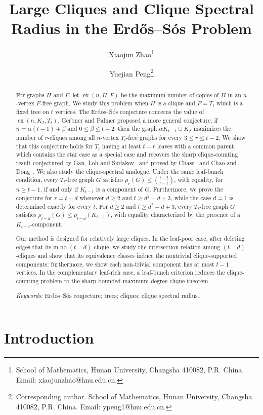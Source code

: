 \documentclass[11pt,a4paper]{article}
\title{Large Cliques and Clique Spectral Radius in the Erd\H{o}s--S\'{o}s Problem}
\author{Xiaojun Zhao\thanks{School of Mathematics, Hunan University, Changsha 410082, P.R. China. Email: xiaojunzhao@hnu.edu.cn.}
\and Yuejian Peng\thanks{Corresponding author. School of Mathematics, Hunan University, Changsha 410082, P.R. China. Email: ypeng1@hnu.edu.cn.}}
\newcommand{\ex}{\operatorname{ex}}
\newcommand{\dunion}{\mathbin{\dot\cup}}
\begin{document}
\setlength{\baselineskip}{14pt}
\maketitle


\begin{abstract}
For graphs \(H\) and \(F\), let \(\ex(n,H,F)\) be the maximum number of copies of \(H\) in an \(n\)-vertex \(F\)-free graph. We study this problem when \(H\) is a clique and \(F=T_t\) which is a fixed tree on \(t\) vertices. The Erd\H{o}s--S\'{o}s conjecture concerns the value of \(\ex(n,K_2, T_t)\). Gerbner and Palmer\cite{GP2026} proposed a more general conjecture: if $n=\alpha(t-1)+\beta$ and $0\le\beta\le t-2$, then the graph \(\alpha K_{t-1}\dunion K_\beta\) maximizes the number of \(r\)-cliques among all $n$-vertex $T_t$-free graphs for every \(3\le r\le t-2\).  We show that this conjecture holds for $T_t$ having at least $t-r$ leaves with a common parent, which contains the star case as a special case and recovers the sharp clique-counting result conjectured by Gan, Loh and Sudakov~\cite{gan2015maximizing} and proved by Chase~\cite{chase2020} and Chao and Dong~\cite{Chao2022}.  We also study the clique-spectral analogue. Under the same leaf-bunch condition, every $T_t$-free graph $G$ satisfies $\rho_r(G)\le\binom{t-2}{r-1}$, with equality, for $n\ge t-1$, if and only if $K_{t-1}$ is a component of $G$. Furthermore,
 we prove the conjecture for \(r=t-d\) whenever \(d\ge2\) and \(t\ge d^2-d+3\), while the case \(d=1\) is determined exactly for every \(t\). For \(d\ge2\) and \(t\ge d^2-d+3\), every \(T_t\)-free graph \(G\) satisfies \(\rho_{t-d}(G)\le\rho_{t-d}(K_{t-1})\), with equality characterized by the presence of a \(K_{t-1}\)-component.

 Our method is designed for relatively large cliques. In the leaf-poor case, after deleting edges that lie in no  $(t-d)$-clique, we study the intersection relation among \((t-d)\)-cliques and show that its equivalence classes induce the nontrivial clique-supported components; furthermore, we show each non-trivial component has at most \(t-1\) vertices. In the complementary leaf-rich case, a leaf-bunch criterion reduces the clique-counting problem to the sharp bounded-maximum-degree clique theorem.

\medskip
\noindent\emph{Keywords:} Erd\H{o}s--S\'{o}s conjecture; trees; cliques; clique spectral radius.
\end{abstract}

\section{Introduction}\label{intro}
\end{document}
